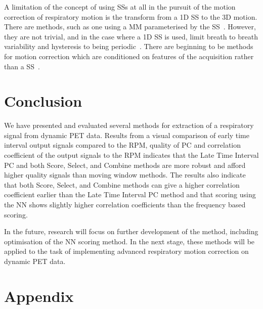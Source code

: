     A limitation of the concept of using \glspl{SS} at all in the pursuit of the motion correction of respiratory motion is the transform from a \gls{1D} \gls{SS} to the \gls{3D} motion. There are methods, such as one using a \gls{MM} parameterised by the \gls{SS}~\parencite{McClelland2017, McClelland2013}. However, they are not trivial, and in the case where a \gls{1D} \gls{SS} is used, limit breath to breath variability and hysteresis to being periodic~\parencite{Whitehead2021ComparisonMap}. There are beginning to be methods for motion correction which are conditioned on features of the acquisition rather than a \gls{SS}~\parencite{Huang2023Surrogate-DrivenData, Huang2024Surrogate-drivenData}.
    
\section{Conclusion} \label{sec:conclusion}
    We have presented and evaluated several methods for extraction of a respiratory signal from dynamic \gls{PET} data. Results from a visual comparison of early time interval output signals compared to the \gls{RPM}, quality of \gls{PC} and correlation coefficient of the output signals to the \gls{RPM} indicates that the Late Time Interval \gls{PC} and both Score, Select, and Combine methods are more robust and afford higher quality signals than moving window methods. The results also indicate that both Score, Select, and Combine methods can give a higher correlation coefficient earlier than the Late Time Interval \gls{PC} method and that scoring using the \gls{NN} shows slightly higher correlation coefficients than the frequency based scoring.

    In the future, research will focus on further development of the method, including optimisation of the \gls{NN} scoring method. In the next stage, these methods will be applied to the task of implementing advanced respiratory motion correction on dynamic \gls{PET} data.

\section*{Appendix} \label{sec:appendix}
